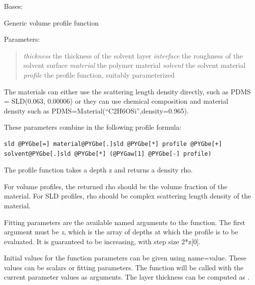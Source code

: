 \documentclass[letterpaper,10pt,english]{sphinxmanual}
\begin{document}
\begin{fulllineitems}
\label{api/polymer:refl1d.polymer.VolumeProfile}
Bases: {\hyperref[api/model:refl1d.model.Layer]{}}

Generic volume profile function

Parameters:
\begin{quote}

\emph{thickness} the thickness of the solvent layer
\emph{interface} the roughness of the solvent surface
\emph{material} the polymer material
\emph{solvent} the solvent material
\emph{profile} the profile function, suitably parameterized
\end{quote}

The materials can either use the scattering length density directly,
such as PDMS = SLD(0.063, 0.00006) or they can use chemical composition
and material density such as PDMS=Material(``C2H6OSi'',density=0.965).

These parameters combine in the following profile formula:

\begin{Verbatim}[commandchars=@\[\]]
sld @PYGbe[=] material@PYGbe[.]sld @PYGbe[*] profile @PYGbe[+] solvent@PYGbe[.]sld @PYGbe[*] (@PYGaw[1] @PYGbe[-] profile)
\end{Verbatim}

The profile function takes a depth z and returns a density rho.

For volume profiles, the returned rho should be the volume fraction
of the material.  For SLD profiles, rho should be complex scattering
length density of the material.

Fitting parameters are the available named arguments to the function.
The first argument must be \emph{z}, which is the array of depths at which
the profile is to be evaluated.  It is guaranteed to be increasing, with
step size 2*z{[}0{]}.

Initial values for the function parameters can be given using name=value.
These values can be scalars or fitting parameters.  The function will
be called with the current parameter values as arguments.  The layer
thickness can be computed as {\hyperref[api/polymer:refl1d.polymer.layer_thickness]{}}.


\end{fulllineitems}
\end{document}
